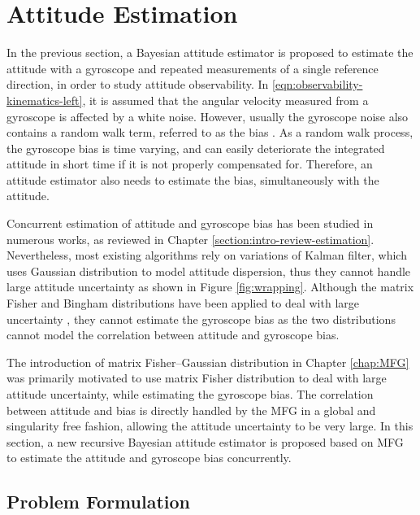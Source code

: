 \section{Attitude Estimation}

In the previous section, a Bayesian attitude estimator is proposed to estimate the attitude with a gyroscope and repeated measurements of a single reference direction, in order to study attitude observability.
In \eqref{eqn:observability-kinematics-left}, it is assumed that the angular velocity measured from a gyroscope is affected by a white noise.
However, usually the gyroscope noise also contains a random walk term, referred to as the bias \cite{crassidis2007survey}.
As a random walk process, the gyroscope bias is time varying, and can easily deteriorate the integrated attitude in short time if it is not properly compensated for.
Therefore, an attitude estimator also needs to estimate the bias, simultaneously with the attitude.

Concurrent estimation of attitude and gyroscope bias has been studied in numerous works, as reviewed in Chapter \ref{section:intro-review-estimation}.
Nevertheless, most existing algorithms rely on variations of Kalman filter, which uses Gaussian distribution to model attitude dispersion, thus they cannot handle large attitude uncertainty as shown in Figure \ref{fig:wrapping}.
Although the matrix Fisher and Bingham distributions have been applied to deal with large uncertainty \cite{glover2014tracking,kurz2014recursive,lee2018bayesian}, they cannot estimate the gyroscope bias as the two distributions cannot model the correlation between attitude and gyroscope bias.

The introduction of matrix Fisher--Gaussian distribution in Chapter \ref{chap:MFG} was primarily motivated to use matrix Fisher distribution to deal with large attitude uncertainty, while estimating the gyroscope bias.
The correlation between attitude and bias is directly handled by the MFG in a global and singularity free fashion, allowing the attitude uncertainty to be very large.
In this section, a new recursive Bayesian attitude estimator is proposed based on MFG to estimate the attitude and gyroscope bias concurrently.

\subsection{Problem Formulation} \label{section:attEst-problem}

